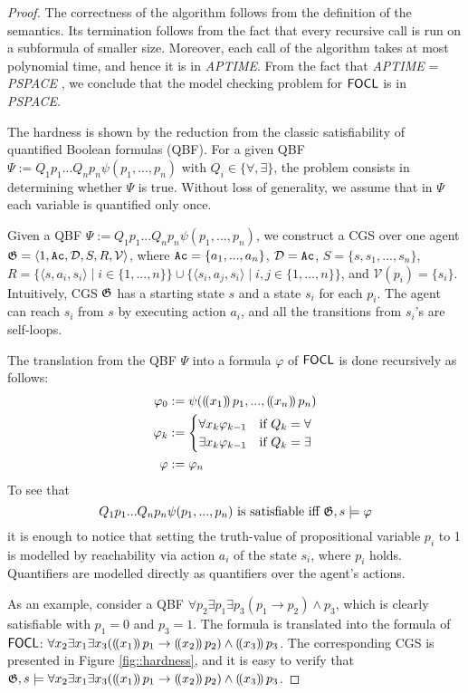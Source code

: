 \documentclass[sigconf,anonymous]{aamas}
\begin{document}
\begin{proof}
The correctness of the algorithm follows from the definition of the semantics. Its termination follows from the fact that every recursive call is run on a subformula of smaller size. Moreover, each call of the algorithm takes at most polynomial time, and hence it is in \textit{APTIME}. From the fact that \textit{APTIME} = \textit{PSPACE} \cite{alternation}, we conclude that the model checking problem for $\mathsf{FOCL}$ is in \textit{PSPACE}.

    The hardness is shown by the reduction from the classic satisfiability of quantified Boolean formulas (QBF). For a given QBF $\Psi:=Q_1 p_1 ... Q_n p_n \psi (p_1, ..., p_n)$ with $Q_i \in \{\forall, \exists\}$, the problem consists in determining whether $\Psi$ is true. Without loss of generality, we assume that in $\Psi$ each variable is quantified only once.

    Given a QBF $\Psi:=Q_1 p_1 ... Q_n p_n \psi (p_1, ..., p_n)$, we construct a CGS over one agent $\mathfrak{G} = \langle 1, \texttt{Ac}, \mathcal{D}, S, R, \mathcal{V} \rangle$, where $\texttt{Ac} = \{a_1, ..., a_n\}$, $\mathcal{D} = \texttt{Ac}$, $S = \{s, s_1, ..., s_n\}$, $R = \{\langle s, a_i, s_i\rangle \mid i \in \{1,...,n\}\} \cup \{\langle s_i, a_j, s_i \rangle \mid i,j \in \{1,...,n\}\}$, and $\mathcal{V}(p_i) = \{s_i\}$. Intuitively, CGS $\mathfrak{G}$ has a starting state $s$ and a state $s_i$ for each $p_i$. The agent can reach $s_i$ from $s$ by executing action $a_i$, and all the transitions from $s_i$'s are self-loops.

    The translation from the QBF $\Psi$ into a formula $\varphi$ of $\mathsf{FOCL}$ is done recursively as follows: 
    \begin{align*}
    \varphi_0 &:= \psi((\!( x_1 )\!)\, p_1, ..., (\!( x_n )\!)\,p_n) \\
    \varphi_k &:=
    \begin{cases}
        \forall x_k \varphi_{k-1} &\text{if } Q_k = \forall\\ 
        \exists x_k \varphi_{k-1} &\text{if } Q_k = \exists\\
    \end{cases}\\
\varphi &:= \varphi_n
\end{align*}
To see that 
$$Q_1 p_1 ... Q_n p_n \psi (p_1, ..., p_n) \text{ is satisfiable iff } \mathfrak{G},s \models \varphi$$
it is enough to notice that setting the truth-value of propositional variable $p_i$ to 1 is modelled by reachability via action $a_i$ of the state $s_i$, where $p_i$ holds. Quantifiers are modelled directly as quantifiers over the agent's actions. 

As an example, consider a QBF $\forall p_2 \exists p_1 \exists p_3 (p_1 \to p_2) \land p_3$, which is clearly satisfiable with $p_1 = 0$ and $p_3 = 1$. The formula is translated into the formula of $\mathsf{FOCL}$: $\forall x_2 \exists x_1  \exists x_3 ((\!( x_1 )\!)\,p_1 \to (\!( x_2 )\!)\,p_2) \land (\!( x_3 )\!)\,p_3$. The corresponding CGS is presented in Figure \ref{fig::hardness}, and it is easy to verify that $\mathfrak{G},s \models \forall x_2 \exists x_1  \exists x_3 ((\!( x_1 )\!)\,p_1 \to (\!( x_2 )\!)\,p_2) \land (\!( x_3 )\!)\,p_3$.
\end{proof}
\end{document}
